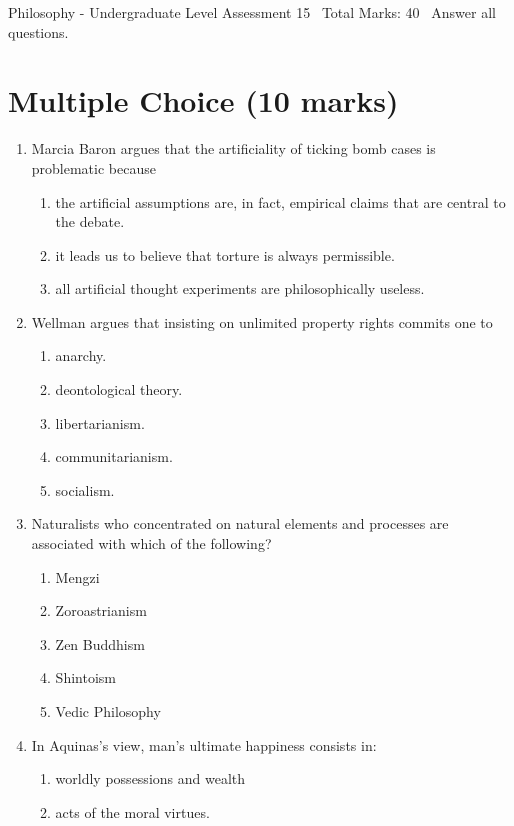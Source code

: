 \documentclass[12pt]{article}
\begin{document}
\begin{center}
Philosophy - Undergraduate Level Assessment 15 \
Total Marks: 40 \
Answer all questions.
\end{center}

\section*{Multiple Choice (10 marks)}
\begin{enumerate}[label=\arabic*.]
\item Marcia Baron argues that the artificiality of ticking bomb cases is problematic because
\begin{enumerate}[label=(\alph*)]
    \item the artificial assumptions are, in fact, empirical claims that are central to the debate.
    \item it leads us to believe that torture is always permissible.
    \item all artificial thought experiments are philosophically useless.
\end{enumerate}
\item Wellman argues that insisting on unlimited property rights commits one to
\begin{enumerate}[label=(\alph*)]
    \item anarchy.
    \item deontological theory.
    \item libertarianism.
    \item communitarianism.
    \item socialism.
\end{enumerate}
\item Naturalists who concentrated on natural elements and processes are associated with which of the following?
\begin{enumerate}[label=(\alph*)]
    \item Mengzi
    \item Zoroastrianism
    \item Zen Buddhism
    \item Shintoism
    \item Vedic Philosophy
\end{enumerate}
\item In Aquinas's view, man's ultimate happiness consists in:
\begin{enumerate}[label=(\alph*)]
    \item worldly possessions and wealth
    \item acts of the moral virtues.

\end{enumerate}
\end{enumerate}
\end{document}
